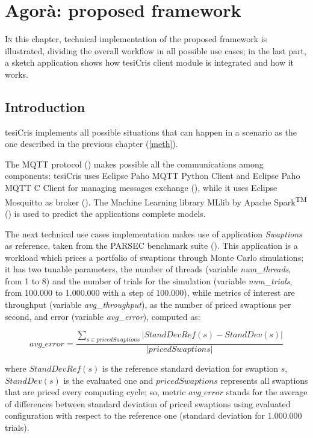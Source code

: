 \chapter{Agorà: proposed framework}

\lettrine{I}{n} this chapter, technical implementation of the proposed framework is illustrated, dividing the overall workflow in all possible use cases; in the last part, a sketch application shows how tesiCris client module is integrated and how it works.


\section{Introduction}

tesiCris implements all possible situations that can happen in a scenario as the one described in the previous chapter (\ref{meth}).

The MQTT protocol (\cite{banks2014mqtt}) makes possible all the communications among components: tesiCris uses Eclipse Paho MQTT Python Client and Eclipse Paho MQTT C Client for managing messages exchange (\cite{o2014paho}), while it uses Eclipse Mos\-quitto as broker (\cite{light2013mosquitto}). The Machine Learning library MLlib by Apache Spark\textsuperscript{TM} (\cite{spark2015apache}) is used to predict the applications complete models.

The next technical use cases implementation makes use of application \textit{Swaptions} as reference, taken from the PARSEC benchmark suite (\cite{bienia2008parsec}). This application is a workload which prices a portfolio of swaptions through Monte Carlo simulations; it has two tunable parameters, the number of threads (variable \textit{num\_threads}, from 1 to 8) and the number of trials for the simulation (variable \textit{num\_trials}, from 100.000 to 1.000.000 with a step of 100.000), while metrics of interest are throughput (variable \textit{avg\_throughput}), as the number of priced swaptions per second, and error (variable \textit{avg\_error}), computed as:

\[
avg\_error = \dfrac{\sum_{s \in pricedSwaptions} \left\vert StandDevRef(s) - StandDev(s) \right\vert}{\left\vert pricedSwaptions \right\vert}
\]

where $StandDevRef(s)$ is the reference standard deviation for swaption $s$, $StandDev(s)$ is the evaluated one and $pricedSwaptions$ represents all swaptions that are priced every computing cycle; so, metric $avg\_error$ stands for the average of differences between standard deviation of priced swaptions using evaluated configuration with respect to the reference one (standard deviation for 1.000.000 trials).

